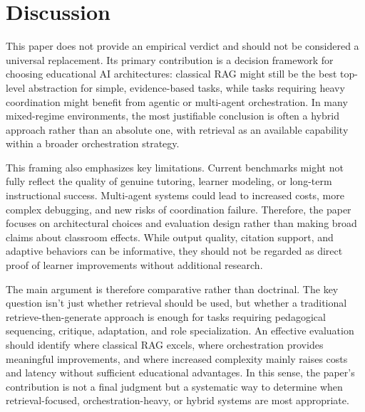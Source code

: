 \section{Discussion}

This paper does not provide an empirical verdict and should not be considered a universal replacement. Its primary contribution is a decision framework for choosing educational AI architectures: classical RAG might still be the best top-level abstraction for simple, evidence-based tasks, while tasks requiring heavy coordination might benefit from agentic or multi-agent orchestration. In many mixed-regime environments, the most justifiable conclusion is often a hybrid approach rather than an absolute one, with retrieval as an available capability within a broader orchestration strategy.

This framing also emphasizes key limitations. Current benchmarks might not fully reflect the quality of genuine tutoring, learner modeling, or long-term instructional success. Multi-agent systems could lead to increased costs, more complex debugging, and new risks of coordination failure. Therefore, the paper focuses on architectural choices and evaluation design rather than making broad claims about classroom effects. While output quality, citation support, and adaptive behaviors can be informative, they should not be regarded as direct proof of learner improvements without additional research.

The main argument is therefore comparative rather than doctrinal. The key question isn’t just whether retrieval should be used, but whether a traditional retrieve-then-generate approach is enough for tasks requiring pedagogical sequencing, critique, adaptation, and role specialization. An effective evaluation should identify where classical RAG excels, where orchestration provides meaningful improvements, and where increased complexity mainly raises costs and latency without sufficient educational advantages. In this sense, the paper's contribution is not a final judgment but a systematic way to determine when retrieval-focused, orchestration-heavy, or hybrid systems are most appropriate.